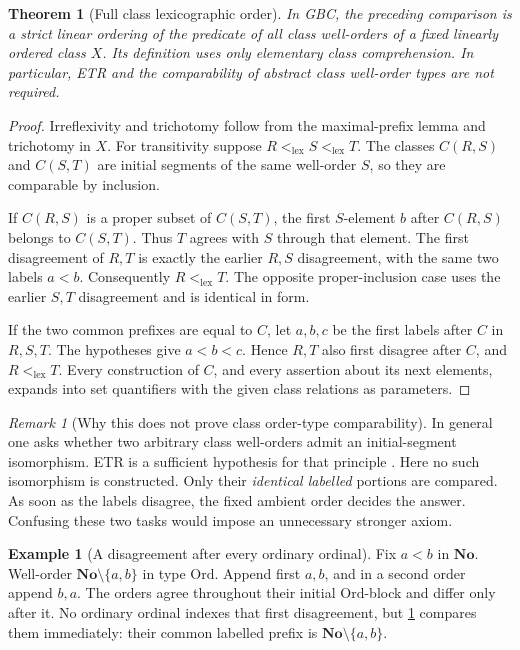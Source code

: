 \documentclass[11pt]{article}
\newtheorem{theorem}{Theorem}[section]
\theoremstyle{definition}
\newtheorem{example}[example]{Example}
\theoremstyle{remark}
\newtheorem{remark}[remark]{Remark}
\newcommand{\No}{\mathbf{No}}
\newcommand{\Ord}{\mathrm{Ord}}
\newcommand{\lex}{\mathrm{lex}}
\begin{document}
\begin{theorem}[Full class lexicographic order]\label{swo:st:thm:fulllex}
In GBC, the preceding comparison is a strict linear ordering of the
predicate of all class well-orders of a fixed linearly ordered class
$X$. Its definition uses only elementary class comprehension. In
particular, ETR and the comparability of abstract class well-order types
are not required.
\end{theorem}
\begin{proof}
Irreflexivity and trichotomy follow from the maximal-prefix lemma and
trichotomy in $X$. For transitivity suppose $R<_{\lex}S<_{\lex}T$.
The classes $C(R,S)$ and $C(S,T)$ are initial segments of the same
well-order $S$, so they are comparable by inclusion.

If $C(R,S)$ is a proper subset of $C(S,T)$, the first $S$-element $b$
after $C(R,S)$ belongs to $C(S,T)$. Thus $T$ agrees with $S$ through that
element. The first disagreement of $R,T$ is exactly the earlier
$R,S$ disagreement, with the same two labels $a<b$. Consequently
$R<_{\lex}T$. The opposite proper-inclusion case uses the earlier
$S,T$ disagreement and is identical in form.

If the two common prefixes are equal to $C$, let $a,b,c$ be the first
labels after $C$ in $R,S,T$. The hypotheses give $a<b<c$. Hence $R,T$
also first disagree after $C$, and $R<_{\lex}T$. Every construction of
$C$, and every assertion about its next elements, expands into set
quantifiers with the given class relations as parameters.
\end{proof}

\begin{remark}[Why this does not prove class order-type comparability]\label{swo:st:n3.5}
In general one asks whether two arbitrary class well-orders admit an
initial-segment isomorphism. ETR is a sufficient hypothesis for that
principle \cite[Theorem 6]{HamkinsWoodin}. Here no such isomorphism is constructed.
Only their \emph{identical labelled} portions are compared. As soon as
the labels disagree, the fixed ambient order decides the answer.
Confusing these two tasks would impose an unnecessary stronger axiom.
\end{remark}

\begin{example}[A disagreement after every ordinary ordinal]\label{swo:st:n3.6}
Fix $a<b$ in $\No$. Well-order $\No\setminus\{a,b\}$ in type $\Ord$.
Append first $a,b$, and in a second order append $b,a$.
The orders agree throughout their initial $\Ord$-block and differ only
after it. No ordinary ordinal indexes that first disagreement, but
\cref{swo:st:thm:fulllex} compares them immediately: their common labelled
prefix is $\No\setminus\{a,b\}$.
\end{example}
\end{document}
